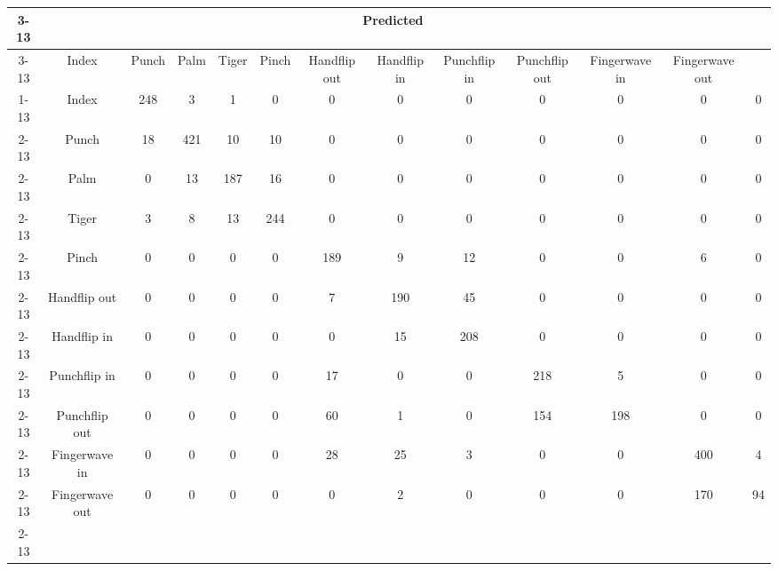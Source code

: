 \documentclass{standalone}
\begin{document}
 
 \begin{tabular}{|c |c |c |c |c |c |c |c |c |c |c |c |c |}
\cline{3-13}\multicolumn{2}{c|}{} & \multicolumn{11}{c|}{Predicted} \\ 
\cline{3-13} \multicolumn{2}{c |}{ } & Index & Punch & Palm & Tiger & Pinch & Handflip out & Handflip in & Punchflip in & Punchflip out & Fingerwave in & Fingerwave out\\ 
\cline{1-13}\multirow{11}{*}{\rotatebox[origin=c]{90}{Actual}} & Index & 248 & 3 & 1 & 0 & 0 & 0 & 0 & 0 & 0 & 0 & 0\\ 
 \cline{2-13} & Punch & 18 & 421 & 10 & 10 & 0 & 0 & 0 & 0 & 0 & 0 & 0\\ 
 \cline{2-13} & Palm & 0 & 13 & 187 & 16 & 0 & 0 & 0 & 0 & 0 & 0 & 0\\ 
 \cline{2-13} & Tiger & 3 & 8 & 13 & 244 & 0 & 0 & 0 & 0 & 0 & 0 & 0\\ 
 \cline{2-13} & Pinch & 0 & 0 & 0 & 0 & 189 & 9 & 12 & 0 & 0 & 6 & 0\\ 
 \cline{2-13} & Handflip out & 0 & 0 & 0 & 0 & 7 & 190 & 45 & 0 & 0 & 0 & 0\\ 
 \cline{2-13} & Handflip in & 0 & 0 & 0 & 0 & 0 & 15 & 208 & 0 & 0 & 0 & 0\\ 
 \cline{2-13} & Punchflip in & 0 & 0 & 0 & 0 & 17 & 0 & 0 & 218 & 5 & 0 & 0\\ 
 \cline{2-13} & Punchflip out & 0 & 0 & 0 & 0 & 60 & 1 & 0 & 154 & 198 & 0 & 0\\ 
 \cline{2-13} & Fingerwave in & 0 & 0 & 0 & 0 & 28 & 25 & 3 & 0 & 0 & 400 & 4\\ 
 \cline{2-13} & Fingerwave out & 0 & 0 & 0 & 0 & 0 & 2 & 0 & 0 & 0 & 170 & 94\\ 
 \cline{2-13}\hline \end{tabular}
 
\end{document}
